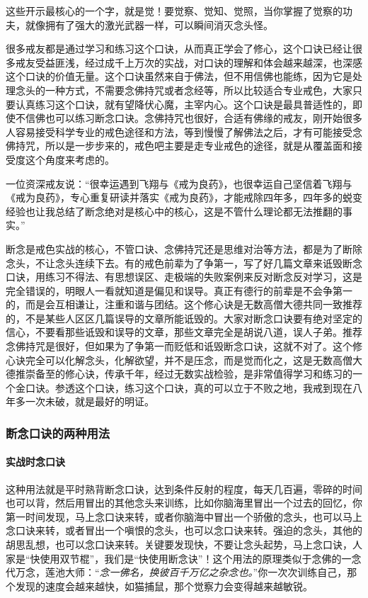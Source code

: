 这些开示最核心的一个字，就是觉！要觉察、觉知、觉照，当你掌握了觉察的功夫，就像拥有了强大的激光武器一样，可以瞬间消灭念头怪。

很多戒友都是通过学习和练习这个口诀，从而真正学会了修心，这个口诀已经让很多戒友受益匪浅，经过成千上万次的实战，对口诀的理解和体会越来越深，也深感这个口诀的价值无量。这个口诀虽然来自于佛法，但不用信佛也能练，因为它是处理念头的一种方式，不需要念佛持咒或者念经等，所以比较适合专业戒色，大家只要认真练习这个口诀，就有望降伏心魔，主宰内心。这个口诀是最具普适性的，即使不信佛也可以练习断念口诀。念佛持咒也很好，合适有佛缘的戒友，刚开始很多人容易接受科学专业的戒色途径和方法，等到慢慢了解佛法之后，才有可能接受念佛持咒，所以是一步步来的，戒色吧主要是走专业戒色的途径，就是从覆盖面和接受度这个角度来考虑的。

一位资深戒友说：“很幸运遇到飞翔与《戒为良药》，也很幸运自己坚信着飞翔与《戒为良药》，专心重复研读并落实《戒为良药》，才能戒除四年多，四年多的蜕变经验也让我总结了断念绝对是核心中的核心，这是不管什么理论都无法推翻的事实。”

断念是戒色实战的核心，不管口诀、念佛持咒还是思维对治等方法，都是为了断除念头，不让念头连续下去。有的戒色前辈为了争第一，写了好几篇文章来诋毁断念口诀，用练习不得法、有思想误区、走极端的失败案例来反对断念反对学习，这是完全错误的，明眼人一看就知道是偏见和误导。真正有德行的前辈是不会争第一的，而是会互相谦让，注重和谐与团结。这个修心诀是无数高僧大德共同一致推荐的，不是某些人区区几篇误导的文章所能诋毁的。大家对断念口诀要有绝对坚定的信心，不要看那些诋毁和误导的文章，那些文章完全是胡说八道，误人子弟。推荐念佛持咒是很好，但如果为了争第一而贬低和诋毁断念口诀，这就不对了。这个修心诀完全可以化解念头，化解欲望，并不是压念，而是觉而化之，这是无数高僧大德推崇备至的修心诀，传承千年，经过无数实战检验，是非常值得学习和练习的一个金口诀。参透这个口诀，练习这个口诀，真的可以立于不败之地，我戒到现在八年多一次未破，就是最好的明证。

\subsubsection{断念口诀的两种用法}

\paragraph{实战时念口诀}

这种用法就是平时熟背断念口诀，达到条件反射的程度，每天几百遍，零碎的时间也可以背，然后用冒出的其他念头来训练，比如你脑海里冒出一个过去的回忆，你第一时间发现，马上念口诀来转，或者你脑海中冒出一个骄傲的念头，也可以马上念口诀来转，或者冒出一个嗔恨的念头，也可以念口诀来转。强迫的念头，其他的胡思乱想，也可以念口诀来转。关键要发现快，不要让念头起势，马上念口诀，人家是“快使用双节棍”，我们是“快使用断念诀”！这个用法的原理类似于念佛的一念代万念，莲池大师：“\textit{念一佛名，换彼百千万亿之杂念也。}”你一次次训练自己，那个发现的速度会越来越快，如猫捕鼠，那个觉察力会变得越来越敏锐。


